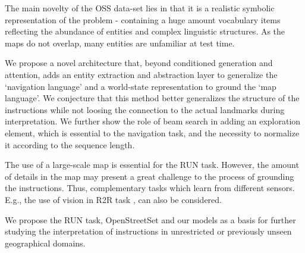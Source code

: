 \documentclass[11pt,a4paper]{article}
\begin{document}
The main novelty of the OSS data-set lies in that it is a realistic symbolic representation of the problem - containing a huge amount vocabulary items reflecting the abundance of entities and complex linguistic structures.
%
As the maps do not overlap,  many entities are unfamiliar at test time.


%



We propose a novel architecture that, beyond conditioned generation and attention,  adds an entity extraction and abstraction layer to generalize the \enquote*{navigation language} and a world-state representation to ground the \enquote*{map language}. We conjecture that this method better generalizes the structure of the instructions  while not loosing the connection to the actual landmarks during interpretation. We further show the role of beam search in adding an exploration element, which  is essential to the navigation task, and the necessity to normalize it according to the sequence length. 



The use of a large-scale map is essential for the RUN task. However, the amount of details in the map may present a great challenge to the process  of grounding the instructions.  Thus,  complementary tasks which learn from different sensors. E.g., the use of vision in R2R task \citep{anderson2018vision}, can also be considered.  
 
We propose  the RUN task, OpenStreetSet  and our models as a basis for further studying the interpretation of  instructions in unrestricted or previously unseen geographical domains.











\end{document}
